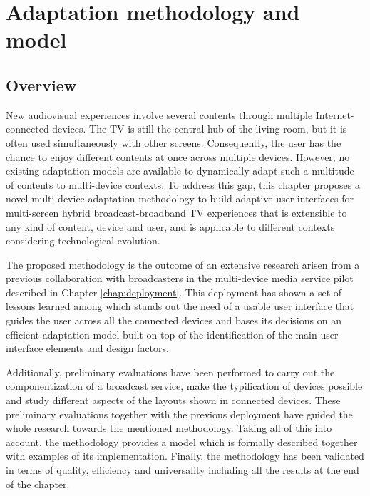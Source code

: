 \chapter{Adaptation methodology and model}
\label{chap:adaptation}

\section{Overview}
New audiovisual experiences involve several contents through multiple Internet-connected devices. The TV is still the central hub of the living room, but it is often used simultaneously with other screens. Consequently, the user has the chance to enjoy different contents at once across multiple devices. However, no existing adaptation models are available to dynamically adapt such a multitude of contents to multi-device contexts. To address this gap, this chapter proposes a novel multi-device adaptation methodology to build adaptive user interfaces for multi-screen hybrid broadcast-broadband TV experiences that is extensible to any kind of content, device and user, and is applicable to different contexts considering technological evolution. 

The proposed methodology is the outcome of an extensive research arisen from a previous collaboration with broadcasters in the multi-device media service pilot described in Chapter \ref{chap:deployment}. This deployment has shown a set of lessons learned among which stands out the need of a usable user interface that guides the user across all the connected devices and bases its decisions on an efficient adaptation model built on top of the identification of the main user interface elements and design factors.

Additionally, preliminary evaluations have been performed to carry out the componentization of a broadcast service, make the typification of devices possible and study different aspects of the layouts shown in connected devices. These preliminary evaluations together with the previous deployment have guided the whole research towards the mentioned methodology. Taking all of this into account, the methodology provides a model which is formally described together with examples of its implementation. Finally, the methodology has been validated in terms of quality, efficiency and universality including all the results at the end of the chapter. 

